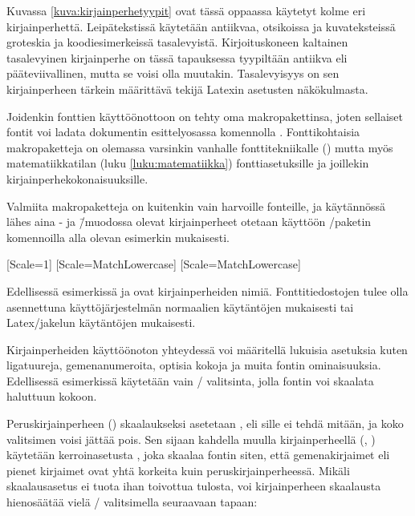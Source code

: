 Kuvassa \ref{kuva:kirjainperhetyypit} ovat tässä oppaassa käytetyt kolme
eri kirjainperhettä. Leipätekstissä käytetään antiikvaa, otsikoissa ja
kuvateksteissä groteskia ja koodiesimerkeissä tasalevyistä.
Kirjoituskoneen kaltainen tasalevyinen kirjainperhe on tässä tapauksessa
tyypiltään antiikva eli pääteviivallinen, mutta se voisi olla muutakin.
Tasalevyisyys on sen kirjainperheen tärkein määrittävä tekijä Latexin
asetusten näkökulmasta.


Joidenkin fonttien käyttöönottoon on tehty oma makropakettinsa, joten
sellaiset fontit voi ladata dokumentin esittelyosassa komennolla
. Fonttikohtaisia makropaketteja on olemassa
varsinkin vanhalle fonttitekniikalle () mutta myös matematiikkatilan (luku \ref{luku:matematiikka})
fonttiasetuksille ja joillekin kir\-jain\-perhe\-koko\-nai\-suuk\-sille.

Valmiita makropaketteja on kuitenkin vain harvoille fonteille, ja
käytännössä lähes aina - ja 
\=/muodossa olevat kirjainperheet otetaan käyttöön
\-/paketin komennoilla alla olevan esimerkin
mukaisesti.

\begin{koodilohkosis}
\setmainfont{TeX Gyre Termes}[Scale=1]
\setsansfont{TeX Gyre Heros} [Scale=MatchLowercase]
\setmonofont{TeX Gyre Cursor}[Scale=MatchLowercase]
\end{koodilohkosis}

Edellisessä esimerkissä  ja
 ovat kirjainperheiden nimiä. Fonttitiedostojen
tulee olla asennettuna käyttöjärjestelmän normaalien käytäntöjen
mukaisesti tai Latex\-/jakelun käytäntöjen mukaisesti.

Kirjainperheiden käyttöönoton yhteydessä voi määritellä lukuisia
asetuksia kuten ligatuureja, gemenanumeroita, optisia kokoja ja muita
fontin ominaisuuksia. Edellisessä esimerkissä käytetään vain
\-/ valitsinta, jolla fontin voi skaalata haluttuun kokoon.

Peruskirjainperheen () skaalaukseksi asetetaan
, eli sille ei tehdä mitään, ja koko valitsimen voisi
jättää pois. Sen sijaan kahdella muulla kirjainperheellä
(, ) käytetään kerroinasetusta
, joka skaalaa fontin siten, että gemenakirjaimet
eli pienet kirjaimet ovat yhtä korkeita kuin peruskirjainperheessä.
Mikäli skaalausasetus  ei tuota ihan toivottua
tulosta, voi kirjainperheen skaalausta hienosäätää vielä
\-/ valitsimella seuraavaan tapaan:


